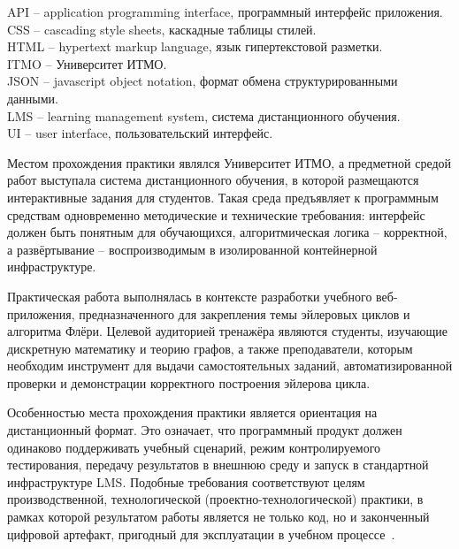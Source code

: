 \documentclass[a4paper,12pt]{extarticle}
\begin{document}
\tableofcontents


\noindent
API -- application programming interface, программный интерфейс приложения.\\
CSS -- cascading style sheets, каскадные таблицы стилей.\\
HTML -- hypertext markup language, язык гипертекстовой разметки.\\
ITMO -- Университет ИТМО.\\
JSON -- javascript object notation, формат обмена структурированными данными.\\
LMS -- learning management system, система дистанционного обучения.\\
UI -- user interface, пользовательский интерфейс.


Местом прохождения практики являлся Университет ИТМО, а предметной средой работ выступала система дистанционного обучения, в которой размещаются интерактивные задания для студентов. Такая среда предъявляет к программным средствам одновременно методические и технические требования: интерфейс должен быть понятным для обучающихся, алгоритмическая логика -- корректной, а развёртывание -- воспроизводимым в изолированной контейнерной инфраструктуре.

Практическая работа выполнялась в контексте разработки учебного веб-приложения, предназначенного для закрепления темы эйлеровых циклов и алгоритма Флёри. Целевой аудиторией тренажёра являются студенты, изучающие дискретную математику и теорию графов, а также преподаватели, которым необходим инструмент для выдачи самостоятельных заданий, автоматизированной проверки и демонстрации корректного построения эйлерова цикла.

Особенностью места прохождения практики является ориентация на дистанционный формат. Это означает, что программный продукт должен одинаково поддерживать учебный сценарий, режим контролируемого тестирования, передачу результатов в внешнюю среду и запуск в стандартной инфраструктуре LMS. Подобные требования соответствуют целям производственной, технологической (проектно-технологической) практики, в рамках которой результатом работы является не только код, но и законченный цифровой артефакт, пригодный для эксплуатации в учебном процессе~\cite{markina2020,gost732}.

\end{document}
